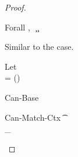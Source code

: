 \documentclass[acmsmall,screen,nonacm%
\Anonymous{,anonymous}{}%
\Final{}{,review}%
]{acmart}
\begin{document}
\begin{theorem}[Canonicalization]
\begin{proof}
\begin{proofcases}
\begin{proofcases}
		\begin{llproof}
	    \decolumnizePf
\Hand             {}
		\end{llproof}
	\end{proofcases}

	\proofcasederivation
	  {Forall}
	  {\forall \gt,~ \semenv\where{\tv \is \gt} \th \c}
	  {\semenv \th \cfor \tv \c}

	  \begin{llproof}
	    Similar to the  case.
	  \end{llproof}

	\proofcasederivation
	  {Let}
    {\semenv\where{\x \is \gabs} \th \cb\\
     \gabs = \semenv(\cabs \tv \ca) \\
     \gabs \neq \eset
     }
    {\semenv \th \clet \x \tv \ca \cb}

    \begin{llproof}
      \casesPf{\semenv\where{\x \is \gabs} \Th \cb}
    \end{llproof}

          \begin{proofcases}
            \proofcasederivation
              {Can-Base}
              {\semenv\where{\x \is \gabs} \th \cb \\ \cb \simple}
              {\semenv\where{\x \is \gabs} \Th \cb}

              \begin{llproof}
\Hand                {}
              \end{llproof}

	    \proofcasederivation
		{Can-Match-Ctx}
		{\Cshape \C \t \sh \\ \semenv\where{\x \is \gabs} \Th \C\where{\cmatched \t \sh \cbrs}}
		{\semenv\where{\x \is \gabs} \Th \underbrace{\C\where{\cmatch \t \cbrs}}_\cb}


\end{proofcases}
\end{proofcases}
\end{proof}
\end{theorem}
\end{document}
